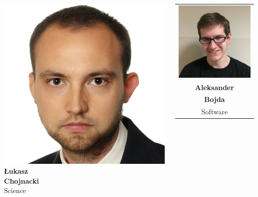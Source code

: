 \documentclass[xcolor=dvipsnames]{beamer}%
\begin{document}
\begin{frame}
\begin{columns}
\begin{minipage}[c][0.3\textheight][c]{\linewidth}
  \includegraphics[height=0.2\textheight]{figure/lukasz_chojnacki.jpg} \\
  \textbf{Łukasz}\\\textbf{Chojnacki}\\
  Science
  
\end{minipage}

\begin{minipage}[c][0.45\textheight][c]{\linewidth}
\centering
    \begin{table}[H]
    \centering
    \begin{tabular}{c}
    \includegraphics[height=0.2\textheight]{figure/aleksander_bojda.jpg}\\
    \textbf{Aleksander}\\\textbf{Bojda}\\
    Software
    \end{tabular}
    \end{table}
\end{minipage}


\end{columns}
\end{frame}
\end{document}
